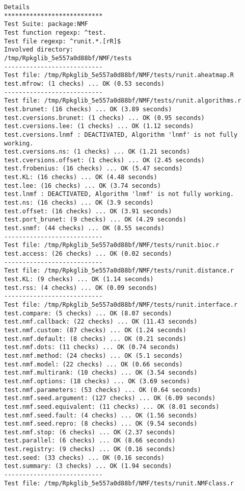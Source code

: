 \documentclass[10pt]{article}
\begin{document}
\begin{verbatim}
Details 
*************************** 
Test Suite: package:NMF 
Test function regexp: ^test. 
Test file regexp: ^runit.*.[rR]$ 
Involved directory: 
/tmp/Rpkglib_5e557a0d88bf/NMF/tests 
--------------------------- 
Test file: /tmp/Rpkglib_5e557a0d88bf/NMF/tests/runit.aheatmap.R 
test.mfrow: (1 checks) ... OK (0.53 seconds)
--------------------------- 
Test file: /tmp/Rpkglib_5e557a0d88bf/NMF/tests/runit.algorithms.r 
test.brunet: (16 checks) ... OK (3.89 seconds)
test.cversions.brunet: (1 checks) ... OK (0.95 seconds)
test.cversions.lee: (1 checks) ... OK (1.12 seconds)
test.cversions.lnmf : DEACTIVATED, Algorithm 'lnmf' is not fully working.
test.cversions.ns: (1 checks) ... OK (1.21 seconds)
test.cversions.offset: (1 checks) ... OK (2.45 seconds)
test.frobenius: (16 checks) ... OK (5.47 seconds)
test.KL: (16 checks) ... OK (4.48 seconds)
test.lee: (16 checks) ... OK (3.74 seconds)
test.lnmf : DEACTIVATED, Algorithm 'lnmf' is not fully working.
test.ns: (16 checks) ... OK (3.9 seconds)
test.offset: (16 checks) ... OK (3.91 seconds)
test.port_brunet: (9 checks) ... OK (4.29 seconds)
test.snmf: (44 checks) ... OK (8.55 seconds)
--------------------------- 
Test file: /tmp/Rpkglib_5e557a0d88bf/NMF/tests/runit.bioc.r 
test.access: (26 checks) ... OK (0.02 seconds)
--------------------------- 
Test file: /tmp/Rpkglib_5e557a0d88bf/NMF/tests/runit.distance.r 
test.KL: (9 checks) ... OK (1.14 seconds)
test.rss: (4 checks) ... OK (0.09 seconds)
--------------------------- 
Test file: /tmp/Rpkglib_5e557a0d88bf/NMF/tests/runit.interface.r 
test.compare: (5 checks) ... OK (8.07 seconds)
test.nmf.callback: (22 checks) ... OK (11.43 seconds)
test.nmf.custom: (87 checks) ... OK (1.24 seconds)
test.nmf.default: (8 checks) ... OK (0.21 seconds)
test.nmf.dots: (11 checks) ... OK (0.74 seconds)
test.nmf.method: (24 checks) ... OK (5.1 seconds)
test.nmf.model: (22 checks) ... OK (0.66 seconds)
test.nmf.multirank: (10 checks) ... OK (3.54 seconds)
test.nmf.options: (18 checks) ... OK (3.69 seconds)
test.nmf.parameters: (53 checks) ... OK (0.64 seconds)
test.nmf.seed.argument: (127 checks) ... OK (6.09 seconds)
test.nmf.seed.equivalent: (11 checks) ... OK (8.01 seconds)
test.nmf.seed.fault: (4 checks) ... OK (1.56 seconds)
test.nmf.seed.repro: (8 checks) ... OK (9.54 seconds)
test.nmf.stop: (6 checks) ... OK (2.37 seconds)
test.parallel: (6 checks) ... OK (8.66 seconds)
test.registry: (9 checks) ... OK (0.16 seconds)
test.seed: (33 checks) ... OK (0.16 seconds)
test.summary: (3 checks) ... OK (1.94 seconds)
--------------------------- 
Test file: /tmp/Rpkglib_5e557a0d88bf/NMF/tests/runit.NMFclass.r 

\end{verbatim}
\end{document}
